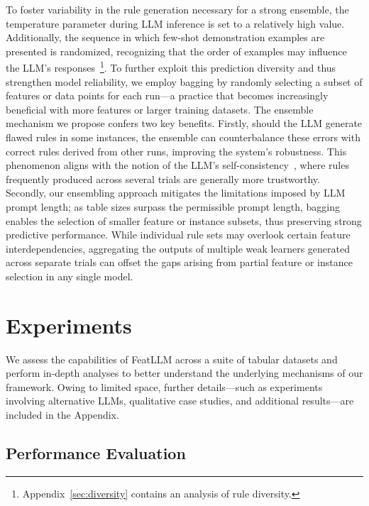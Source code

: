 To foster variability in the rule generation necessary for a strong ensemble, the temperature parameter during LLM inference is set to a relatively high value. Additionally, the sequence in which few-shot demonstration examples are presented is randomized, recognizing that the order of examples may influence the LLM’s responses~\cite{lu2022fantastically}\footnote{Appendix~\ref{sec:diversity} contains an analysis of rule diversity.}. To further exploit this prediction diversity and thus strengthen model reliability, we employ bagging by randomly selecting a subset of features or data points for each run—a practice that becomes increasingly beneficial with more features or larger training datasets. The ensemble mechanism we propose confers two key benefits. Firstly, should the LLM generate flawed rules in some instances, the ensemble can counterbalance these errors with correct rules derived from other runs, improving the system’s robustness. This phenomenon aligns with the notion of the LLM’s self-consistency~\cite{wang2022self}, where rules frequently produced across several trials are generally more trustworthy. Secondly, our ensembling approach mitigates the limitations imposed by LLM prompt length; as table sizes surpass the permissible prompt length, bagging enables the selection of smaller feature or instance subsets, thus preserving strong predictive performance. While individual rule sets may overlook certain feature interdependencies, aggregating the outputs of multiple weak learners generated across separate trials can offset the gaps arising from partial feature or instance selection in any single model.

\section{Experiments}
We assess the capabilities of \textsf{FeatLLM} across a suite of tabular datasets and perform in-depth analyses to better understand the underlying mechanisms of our framework. Owing to limited space, further details—such as experiments involving alternative LLMs, qualitative case studies, and additional results—are included in the Appendix.

\subsection{Performance Evaluation}
